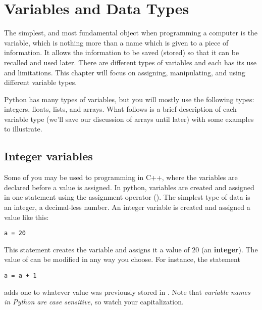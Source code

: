 \chapter{Variables and Data Types}
\label{chap:variablesDataTypes}


The simplest, and most fundamental object when programming a computer
is the variable, which is nothing more than a name which is given to a
piece of information. It allows the information to be saved (stored)
so that it can be recalled and used later.   There
are different types of variables and each has its use and
limitations.  This chapter will focus on assigning,
manipulating, and using different variable types.


Python has many types of variables, but you will mostly
use the following types: integers, floats, lists, and arrays.  What
follows is a brief description of each variable type (we'll save our
discussion of arrays until later) with some examples to illustrate.

\section{Integer variables}
Some of you may be used to programming in C++, where
the variables are declared before a value is assigned.  In python,
variables are created and assigned in one statement using the
assignment operator (\code{=}).  The simplest type of data is an
integer, a decimal-less number.  An integer variable is created and
assigned a value like this:
\begin{Verbatim}
a = 20
\end{Verbatim}
This statement creates the variable  and assigns it a value of
$20$ (an \textbf{integer}).  The value of  can be modified in
any way you choose.  For instance, the statement
\begin{Verbatim}
a = a + 1
\end{Verbatim}
adds one to whatever value was previously stored in
.   Note that {\it variable names in Python
  are case sensitive,} so watch your capitalization.  





